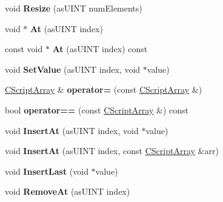 \begin{DoxyCompactItemize}
void {\bfseries Resize} (as\+U\+I\+NT num\+Elements)
\item 
\mbox{\label{class_c_script_array_ac179b031c789763b6d7cecb8c07157f5}} 
void $\ast$ {\bfseries At} (as\+U\+I\+NT index)
\item 
\mbox{\label{class_c_script_array_ab0a2decafb780ad7bbbc9c69a308b3c9}} 
const void $\ast$ {\bfseries At} (as\+U\+I\+NT index) const
\item 
\mbox{\label{class_c_script_array_ad84bc1e1fb44fe34fffa5d46c389a09f}} 
void {\bfseries Set\+Value} (as\+U\+I\+NT index, void $\ast$value)
\item 
\mbox{\label{class_c_script_array_a9b4e1b2726012e83b6426bd1f2863075}} 
\hyperlink{class_c_script_array}{C\+Script\+Array} \& {\bfseries operator=} (const \hyperlink{class_c_script_array}{C\+Script\+Array} \&)
\item 
\mbox{\label{class_c_script_array_a3b4ee8c5da2348f7f22558b73763e2e0}} 
bool {\bfseries operator==} (const \hyperlink{class_c_script_array}{C\+Script\+Array} \&) const
\item 
\mbox{\label{class_c_script_array_a5783becfa2a47a1e0216475b96698cd5}} 
void {\bfseries Insert\+At} (as\+U\+I\+NT index, void $\ast$value)
\item 
\mbox{\label{class_c_script_array_a9171c3d542fdab793218947fa7b33a6a}} 
void {\bfseries Insert\+At} (as\+U\+I\+NT index, const \hyperlink{class_c_script_array}{C\+Script\+Array} \&arr)
\item 
\mbox{\label{class_c_script_array_ab885ff32eed1bb81d599fbf46e30915f}} 
void {\bfseries Insert\+Last} (void $\ast$value)
\item 
\mbox{\label{class_c_script_array_a569bab2097259d4373c080affdf958f3}} 
void {\bfseries Remove\+At} (as\+U\+I\+NT index)
\item 
\mbox{\label{class_c_script_array_a067270b5841aeb55e42e53e6e26bcfb1}} 

\end{DoxyCompactItemize}
